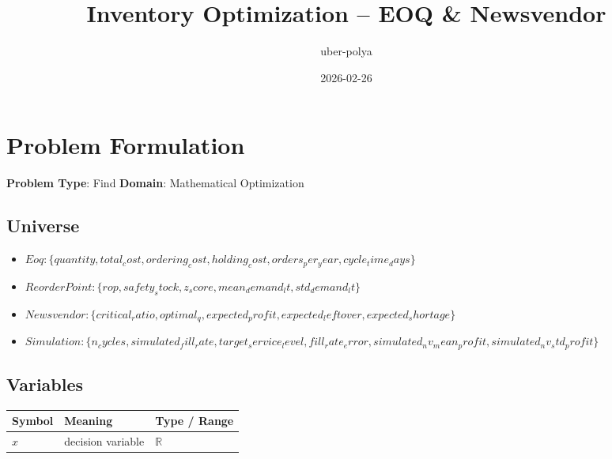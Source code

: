 \documentclass[11pt, a4paper]{article}
\title{Inventory Optimization -- EOQ \& Newsvendor}
\author{uber-polya}
\date{2026-02-26}
\begin{document}
\maketitle
\tableofcontents
\newpage

\section{Problem Formulation}

\begin{polyamodel}

\textbf{Problem Type}: Find \hfill
\textbf{Domain}: Mathematical Optimization


\end{polyamodel}

\subsection{Universe}

\begin{itemize}
  \item $Eoq: \{quantity, total_cost, ordering_cost, holding_cost, orders_per_year, cycle_time_days\}$
  \item $Reorder Point: \{rop, safety_stock, z_score, mean_demand_lt, std_demand_lt\}$
  \item $Newsvendor: \{critical_ratio, optimal_q, expected_profit, expected_leftover, expected_shortage\}$
  \item $Simulation: \{n_cycles, simulated_fill_rate, target_service_level, fill_rate_error, simulated_nv_mean_profit, simulated_nv_std_profit\}$
\end{itemize}

\subsection{Variables}

\begin{longtable}{lll}
\toprule
\textbf{Symbol} & \textbf{Meaning} & \textbf{Type / Range} \\
\midrule
\endhead
$x$ & decision variable & $\mathbb{{R}}$ \\
\bottomrule
\end{longtable}

\end{document}
